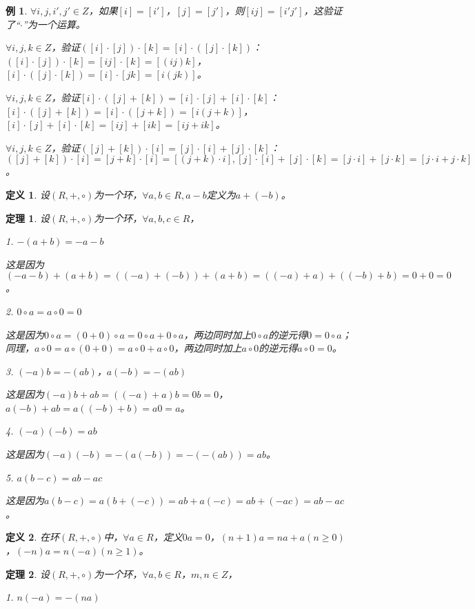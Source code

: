 \documentclass{article}
\newtheorem{Def}{定义}
\newtheorem{Thm}{定理}
\newtheorem*{Example}{例}
\begin{document}
\begin{CJK*}{UTF8}{gbsn}
\begin{Example}
  $\forall i,j,i',j'\in Z$，如果$[i]=[i']$，$[j]=[j']$，则$[ij]=[i'j']$，这验证了“$\cdot$”为一个运算。

  $\forall i,j,k\in Z$，验证$([i]\cdot [j])\cdot [k]=[i]\cdot ([j]\cdot [k])$：$([i]\cdot [j])\cdot [k]=[ij]\cdot [k]=[(ij)k]$，$[i]\cdot ([j]\cdot [k])=[i]\cdot [jk]=[i(jk)]$。

$\forall i,j,k\in Z$，验证$[i]\cdot ([j]+[k])=[i]\cdot [j] + [i]\cdot [k]$：$[i]\cdot([j]+[k])=[i]\cdot([j+k])=[i(j+k)]$，$[i]\cdot [j]+[i]\cdot [k]=[ij]+[ik]=[ij+ik]$。

$\forall i,j,k\in Z$，验证$([j]+[k])\cdot [i]=[j]\cdot [i]+[j]\cdot [k]$：$([j]+[k])\cdot [i]=[j+k]\cdot[i]=[(j+k)\cdot i],[j]\cdot [i]+[j]\cdot [k]=[j\cdot i]+[j\cdot k]=[j\cdot i+j\cdot k]$。

\end{Example}
\begin{Def}
  设$(R,+,\circ)$为一个环，$\forall a,b\in R,a-b$定义为$a+(-b)$。
\end{Def}
\begin{Thm}
  设$(R,+,\circ)$为一个环，$\forall a,b,c\in R$，

  1. $-(a+b)=-a-b$

  这是因为$(-a-b)+(a+b)=((-a)+(-b))+(a+b)=((-a)+a)+((-b)+b)=0+0=0$。

  2. $0\circ a = a\circ 0 = 0$

  这是因为$0\circ a = (0+0)\circ a=0\circ a+0\circ a$，两边同时加上$0\circ a$的逆元得$0=0\circ a$；同理，$a\circ 0=a\circ (0+0)=a\circ 0 + a\circ 0$，两边同时加上$a\circ 0$的逆元得$a\circ 0=0$。

  3. $(-a)b = -(ab)$，$a(-b)=-(ab)$

  这是因为$(-a)b+ab=((-a)+a)b=0b=0$，$a(-b)+ab=a((-b)+b)=a0=a$。


  4. $(-a)(-b)=ab$

  这是因为$(-a)(-b)=-(a(-b))=-(-(ab))=ab$。

  5. $a(b-c)=ab-ac$

  这是因为$a(b-c)=a(b+(-c))=ab+a(-c)=ab+(-ac)=ab-ac$。
\end{Thm}

\begin{Def}
  在环$(R,+,\circ)$中，$\forall a\in R$，定义$0a=0$，$(n+1)a=na+a(n\geq 0)$，$(-n)a=n(-a)(n\geq 1)$。
\end{Def}

\begin{Thm}
  设$(R,+,\circ)$为一个环，$\forall a,b \in R$，$m, n \in Z$，

  1. $n(-a)=-(na)$


\end{Thm}
\end{CJK*}
\end{document}
